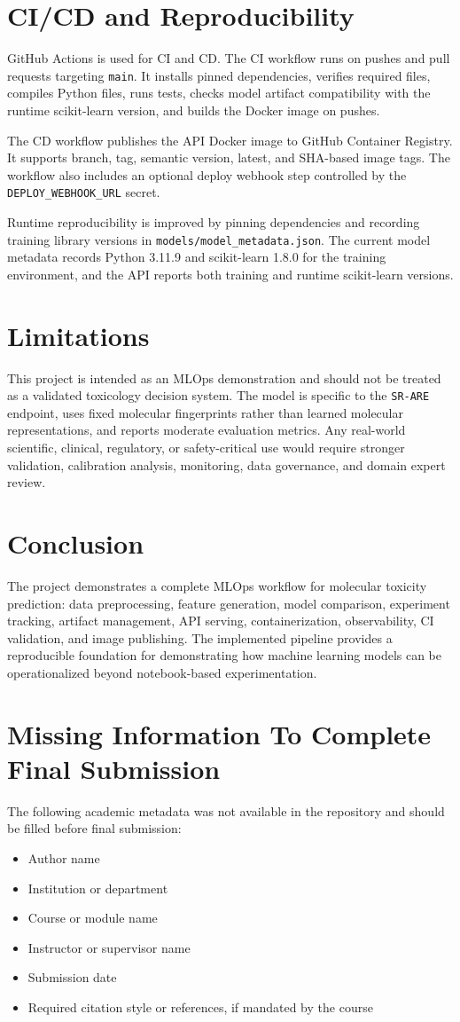\documentclass[conference]{IEEEtran}
\begin{document}
\section{CI/CD and Reproducibility}
GitHub Actions is used for CI and CD. The CI workflow runs on pushes and pull requests targeting \texttt{main}. It installs pinned dependencies, verifies required files, compiles Python files, runs tests, checks model artifact compatibility with the runtime scikit-learn version, and builds the Docker image on pushes.

The CD workflow publishes the API Docker image to GitHub Container Registry. It supports branch, tag, semantic version, latest, and SHA-based image tags. The workflow also includes an optional deploy webhook step controlled by the \texttt{DEPLOY\_WEBHOOK\_URL} secret.

Runtime reproducibility is improved by pinning dependencies and recording training library versions in \texttt{models/model\_metadata.json}. The current model metadata records Python 3.11.9 and scikit-learn 1.8.0 for the training environment, and the API reports both training and runtime scikit-learn versions.

\section{Limitations}
This project is intended as an MLOps demonstration and should not be treated as a validated toxicology decision system. The model is specific to the \texttt{SR-ARE} endpoint, uses fixed molecular fingerprints rather than learned molecular representations, and reports moderate evaluation metrics. Any real-world scientific, clinical, regulatory, or safety-critical use would require stronger validation, calibration analysis, monitoring, data governance, and domain expert review.

\section{Conclusion}
The project demonstrates a complete MLOps workflow for molecular toxicity prediction: data preprocessing, feature generation, model comparison, experiment tracking, artifact management, API serving, containerization, observability, CI validation, and image publishing. The implemented pipeline provides a reproducible foundation for demonstrating how machine learning models can be operationalized beyond notebook-based experimentation.

\section*{Missing Information To Complete Final Submission}
The following academic metadata was not available in the repository and should be filled before final submission:

\begin{itemize}
    \item Author name
    \item Institution or department
    \item Course or module name
    \item Instructor or supervisor name
    \item Submission date
    \item Required citation style or references, if mandated by the course
\end{itemize}
\end{document}
